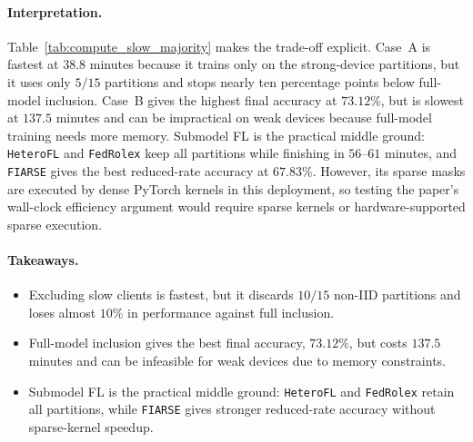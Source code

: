 \paragraph{Interpretation.}
Table~\ref{tab:compute_slow_majority} makes the trade-off explicit. Case~A is fastest at \(38.8\) minutes because it trains only on the strong-device partitions, but it uses only \(5/15\) partitions and stops nearly ten percentage points below full-model inclusion. Case~B gives the highest final accuracy at \(73.12\%\), but is slowest at \(137.5\) minutes and can be impractical on weak devices because full-model training needs more memory. 
Submodel FL is the practical middle ground: \texttt{HeteroFL} and \texttt{FedRolex} keep all partitions while finishing in \(56\)--\(61\) minutes, and \texttt{FIARSE} gives the best reduced-rate accuracy at \(67.83\%\). However, its sparse masks are executed by dense PyTorch kernels in this deployment, so testing the paper's wall-clock efficiency argument would require sparse kernels or hardware-supported sparse execution.


\paragraph{Takeaways.}
\begin{itemize}[leftmargin=*, nosep]
  \item Excluding slow clients is fastest, but it discards \(10/15\) non-IID partitions and loses almost \(10\)\% in performance against full inclusion.
  \item Full-model inclusion gives the best final accuracy, \(73.12\%\), but costs \(137.5\) minutes and can be infeasible for weak devices due to memory constraints.
  \item Submodel FL is the practical middle ground: \texttt{HeteroFL} and \texttt{FedRolex} retain all partitions, while \texttt{FIARSE} gives stronger reduced-rate accuracy without sparse-kernel speedup.
\end{itemize}

